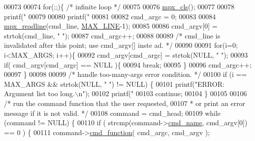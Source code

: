 \begin{DoxyCode}
00073 
00074         \textcolor{keywordflow}{for}(;;)\{ \textcolor{comment}{/* infinite loop */}
00075 
00076                 \hyperlink{mpx__util_8c_a8cf3281978ba1652fd5d643e1a41f70b}{mpx_cls}();
00077 
00078                 printf(\textcolor{stringliteral}{"%
00079 
00080                 printf(\textcolor{stringliteral}{"%
00081 
00082                 cmd\_argc = 0;
00083 
00084                 \hyperlink{mpx__util_8c_a781169ab05ad54c0d37253d73060b77f}{mpx_readline}(cmd\_line, \hyperlink{mpx__cmd_8h_a842ed03f27719bc87666bfd1f75415b8}{MAX_LINE}-1);     
00085 
00086                 cmd\_argv[0] = strtok(cmd\_line, \textcolor{stringliteral}{" "});
00087                 cmd\_argc++;
00088 
00089                 \textcolor{comment}{/* cmd\_line is invalidated after this point; use cmd\_argv[] inste
      ad. */}
00090 
00091                 \textcolor{keywordflow}{for}(i=0; i<MAX\_ARGS; i++)\{
00092                         cmd\_argv[cmd\_argc] = strtok(NULL, \textcolor{stringliteral}{" "});
00093                         \textcolor{keywordflow}{if}( cmd\_argv[cmd\_argc] == NULL )\{
00094                                 \textcolor{keywordflow}{break};
00095                         \}
00096                         cmd\_argc++;
00097                 \}
00098 
00099                 \textcolor{comment}{/* handle too-many-args error condition. */}
00100                 \textcolor{keywordflow}{if} (i == MAX\_ARGS && strtok(NULL, \textcolor{stringliteral}{" "}) != NULL) \{
00101                         printf(\textcolor{stringliteral}{"ERROR: Argument list too long.\(\backslash\)n"});
00102                         printf(\textcolor{stringliteral}{"%
00103                         \textcolor{keywordflow}{continue};
00104                 \}
00105 
00106                 \textcolor{comment}{/* run the command function that the user requested,}
00107 \textcolor{comment}{                 * or print an error message if it is not valid. */}
00108                 command = cmd\_head;
00109                 \textcolor{keywordflow}{while} (command != NULL) \{
00110                         \textcolor{keywordflow}{if} ( strcmp(command->\hyperlink{structmpx__cmd_aeae73296151ffcec319820f4d8399e51}{cmd_name}, cmd\_argv[0]) == 0 ) \{
00111                                 command->\hyperlink{structmpx__cmd_ad35d459cc43aac3f75fb308e07572253}{cmd_function}( cmd\_argc, cmd\_argv );
}}}
\end{DoxyCode}
